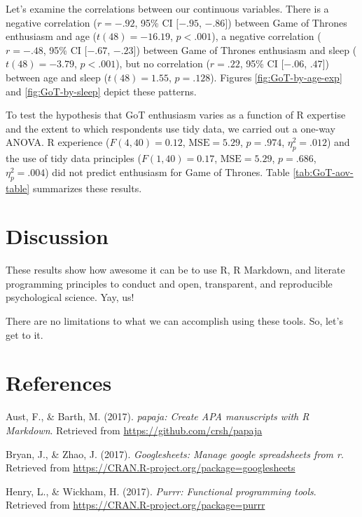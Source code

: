 \documentclass[english,man]{apa6}
\theoremstyle{definition}
\theoremstyle{definition}
\theoremstyle{remark}
\begin{document}
Let's examine the correlations between our continuous variables. There
is a negative correlation (\(r = -.92\), 95\% CI \([-.95\), \(-.86]\))
between Game of Thrones enthusiasm and age (\(t(48) = -16.19\),
\(p < .001\)), a negative correlation (\(r = -.48\), 95\% CI \([-.67\),
\(-.23]\)) between Game of Thrones enthusiasm and sleep
(\(t(48) = -3.79\), \(p < .001\)), but no correlation (\(r = .22\), 95\%
CI \([-.06\), \(.47]\)) between age and sleep (\(t(48) = 1.55\),
\(p = .128\)). Figures \ref{fig:GoT-by-age-exp} and
\ref{fig:GoT-by-sleep} depict these patterns.

To test the hypothesis that GoT enthusiasm varies as a function of R
expertise and the extent to which respondents use tidy data, we carried
out a one-way ANOVA. R experience (\(F(4, 40) = 0.12\),
\(\mathrm{MSE} = 5.29\), \(p = .974\), \(\eta^2_p = .012\)) and the use
of tidy data principles (\(F(1, 40) = 0.17\), \(\mathrm{MSE} = 5.29\),
\(p = .686\), \(\eta^2_p = .004\)) did not predict enthusiasm for Game
of Thrones. Table \ref{tab:GoT-aov-table} summarizes these results.

\section{Discussion}\label{discussion}

These results show how awesome it can be to use R, R Markdown, and
literate programming principles to conduct and open, transparent, and
reproducible psychological science. Yay, us!

There are no limitations to what we can accomplish using these tools.
So, let's get to it.

\newpage

\section{References}\label{references}

\setlength{\parindent}{-0.5in} \setlength{\leftskip}{0.5in}

\hypertarget{refs}{}
\hypertarget{ref-R-papaja}{}
Aust, F., \& Barth, M. (2017). \emph{papaja: Create APA manuscripts with
R Markdown}. Retrieved from \url{https://github.com/crsh/papaja}

\hypertarget{ref-R-googlesheets}{}
Bryan, J., \& Zhao, J. (2017). \emph{Googlesheets: Manage google
spreadsheets from r}. Retrieved from
\url{https://CRAN.R-project.org/package=googlesheets}

\hypertarget{ref-R-purrr}{}
Henry, L., \& Wickham, H. (2017). \emph{Purrr: Functional programming
tools}. Retrieved from \url{https://CRAN.R-project.org/package=purrr}
\end{document}
